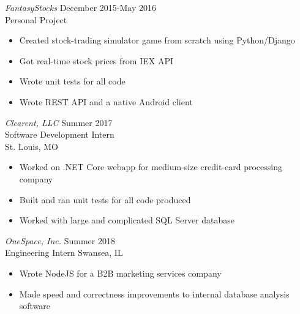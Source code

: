 \documentclass[margin]{res}
\begin{document}
\begin{resume}
             {\sl FantasyStocks} \hfill December 2015-May 2016 \\
             Personal Project 
            \begin{itemize} \itemsep -2pt %
                \item Created stock-trading simulator game from scratch using Python/Django
                \item Got real-time stock prices from IEX API
                \item Wrote unit tests for all code
                \item Wrote REST API and a native Android client
            \end{itemize}
 
                {\sl Clearent, LLC } \hfill            Summer 2017 \\
                Software Development Intern \\
                St. Louis, MO
                 \begin{itemize}  \itemsep -2pt %
                 \item Worked on .NET Core webapp for medium-size credit-card processing company
                 \item Built and ran unit tests for all code produced
                 \item Worked with large and complicated SQL Server database
                 \end{itemize} 

                {\sl OneSpace, Inc.} \hfill        Summer 2018 \\
                Engineering Intern
                Swansea, IL
                \begin{itemize} \itemsep -2pt %
                    \item Wrote NodeJS for a B2B marketing services company
                    \item Made speed and correctness improvements to internal database analysis software
                \end{itemize} 


\end{resume}
\end{document}
